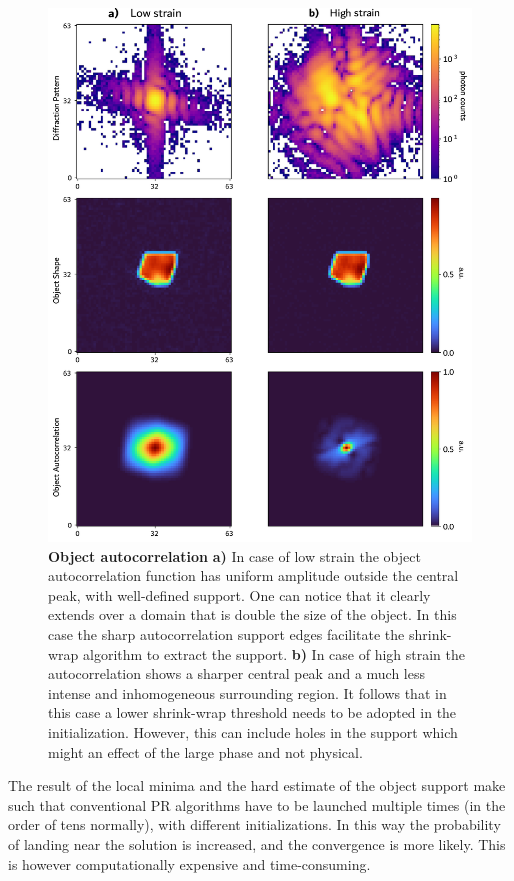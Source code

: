 \begin{figure}[H]
    \centering
    \includegraphics[width=.7\textwidth]{figures/Intro/autocorr.pdf}
    \caption{\textbf{Object autocorrelation} \textbf{a)} In case of low strain the object autocorrelation function has 
    uniform amplitude outside the central peak, with well-defined support. One can notice that it clearly extends over a domain 
    that is double the size of the object. 
    In this case the sharp autocorrelation support edges facilitate the shrink-wrap algorithm to extract the support. \textbf{b)} In case of high 
    strain the autocorrelation shows a sharper central peak and a much less intense and inhomogeneous surrounding region. 
    It follows that in this case a lower shrink-wrap threshold needs to be adopted in the initialization. However, this can 
    include holes in the support which might an effect of the large phase and not physical. }
    \label{fig:autocorr}
\end{figure}

The result of the local minima and the hard estimate of the object support make such that conventional PR algorithms
have to be launched multiple times (in the order of tens normally), with different initializations. In this way the probability 
of landing near the solution is increased, and the convergence is more likely. This is however computationally expensive 
and time-consuming. 

